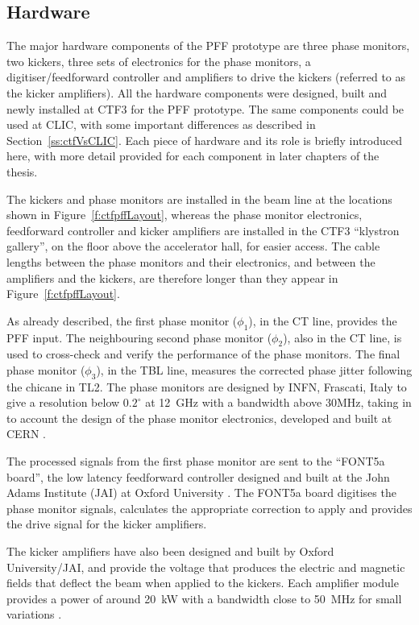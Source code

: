 \subsection{Hardware}
\label{ss:ctfPFFHardware}

The major hardware components of the PFF prototype are three phase monitors, two kickers, three sets of electronics for the phase monitors, a digitiser/feedforward controller and amplifiers to drive the kickers (referred to as the kicker amplifiers). All the hardware components were designed, built and newly installed at CTF3 for the PFF prototype. The same components could be used at CLIC, with some important differences as described in Section~\ref{ss:ctfVsCLIC}. Each piece of hardware and its role is briefly introduced here, with more detail provided for each component in later chapters of the thesis.

The kickers and phase monitors are installed in the beam line at the locations shown in Figure~\ref{f:ctfpffLayout}, whereas the phase monitor electronics, feedforward controller and kicker amplifiers are installed in the CTF3 ``klystron gallery'', on the floor above the accelerator hall, for easier access. The cable lengths between the phase monitors and their electronics, and between the amplifiers and the kickers, are therefore longer than they appear in Figure~\ref{f:ctfpffLayout}.

As already described, the first phase monitor (\(\phi_1\)), in the CT line, provides the PFF input. The neighbouring second phase monitor (\(\phi_2\)), also in the CT line, is used to cross-check and verify the performance of the phase monitors. The final phase monitor (\(\phi_3\)), in the TBL line, measures the corrected phase jitter following the chicane in TL2. The phase monitors are designed by INFN, Frascati, Italy \cite{phMonEuCard} to give a resolution below \(0.2^\circ\) at 12~GHz with a bandwidth above 30MHz, taking in to account the  design of the phase monitor electronics, developed and built at CERN \cite{phMonEuCard}.

The processed signals from the first phase monitor are sent to the ``FONT5a board'', the low latency feedforward controller designed and built at the John Adams Institute (JAI) at Oxford University \cite{fontGroup}. The FONT5a board digitises the phase monitor signals, calculates the appropriate correction to apply and provides the drive signal for the kicker amplifiers.

The kicker amplifiers have also been designed and built by Oxford University/JAI, and provide the voltage that produces the electric and magnetic fields that deflect the beam when applied to the kickers. Each amplifier module provides a power of around 20~kW with a bandwidth close to 50~MHz for small variations \cite{colinCLIC16}. 

